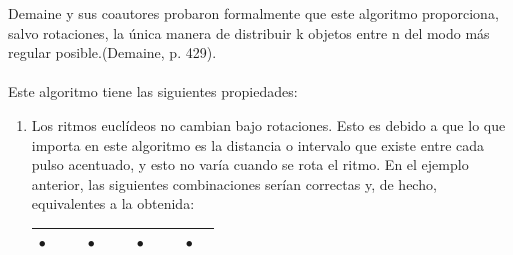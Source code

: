 \documentclass[a4paper, openright, 11pt, titlepage]{report}
\theoremstyle{definition}\newtheorem{defin}[propo]{Definition}
\theoremstyle{definition}\newtheorem{obser}[propo]{Remark}
\theoremstyle{definition}\newtheorem{ejem}[propo]{Ejemplo}
\theoremstyle{definition}\newtheorem{algoritmo}[propo]{Algoritmo}
\begin{document}
Demaine y sus coautores probaron formalmente que este algoritmo proporciona, salvo rotaciones, la única manera de distribuir k objetos entre n del modo más regular posible.\cite{demaine}(Demaine, p. 429).\\\\
Este algoritmo tiene las siguientes propiedades:
\begin{enumerate}
    \item Los ritmos euclídeos no cambian bajo rotaciones. Esto es debido a que lo que importa en este algoritmo es la distancia o intervalo que existe entre cada pulso acentuado, y esto no varía cuando se rota el ritmo. En el ejemplo anterior, las siguientes combinaciones serían correctas y, de hecho, equivalentes a la obtenida:
    \begin{table}[H]
        \centering
        \begin{tabular}{|c|c|c|c|c|c|c|c|c|c|c|}
        \hline
            $\bullet$ & & & $\bullet$ & & & $\bullet$ & & &$\bullet$ &\\
            \hline
        \end{tabular}
        \end{table}


\end{enumerate}
\end{document}
